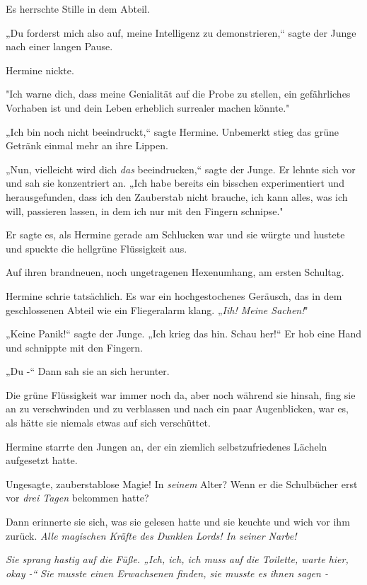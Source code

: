 {Es herrschte Stille in dem Abteil.

„Du forderst mich also auf, meine Intelligenz zu demonstrieren,“ sagte der Junge nach einer langen Pause.

Hermine nickte.

"Ich warne dich, dass meine Genialität auf die Probe zu stellen, ein gefährliches Vorhaben ist und dein Leben erheblich surrealer machen könnte."

„Ich bin noch nicht beeindruckt,“ sagte Hermine. Unbemerkt stieg das grüne Getränk einmal mehr an ihre Lippen.

„Nun, vielleicht wird dich \emph{das} beeindrucken,“ sagte der Junge. Er lehnte sich vor und sah sie konzentriert an. „Ich habe bereits ein bisschen experimentiert und herausgefunden, dass ich den Zauberstab nicht brauche, ich kann alles, was ich will, passieren lassen, in dem ich nur mit den Fingern schnipse."

Er sagte es, als Hermine gerade am Schlucken war und sie würgte und hustete und spuckte die hellgrüne Flüssigkeit aus.

Auf ihren brandneuen, noch ungetragenen Hexenumhang, am ersten Schultag.

Hermine schrie tatsächlich. Es war ein hochgestochenes Geräusch, das in dem geschlossenen Abteil wie ein Fliegeralarm klang. „\emph{Iih! Meine Sachen!}"

„Keine Panik!“ sagte der Junge. „Ich krieg das hin. Schau her!“ Er hob eine Hand und schnippte mit den Fingern.

„Du -“ Dann sah sie an sich herunter.

Die grüne Flüssigkeit war immer noch da, aber noch während sie hinsah, fing sie an zu verschwinden und zu verblassen und nach ein paar Augenblicken, war es, als hätte sie niemals etwas auf sich verschüttet.

Hermine starrte den Jungen an, der ein ziemlich selbstzufriedenes Lächeln aufgesetzt hatte.

Ungesagte, zauberstablose Magie! In \emph{seinem} Alter? Wenn er die Schulbücher erst vor \emph{drei Tagen} bekommen hatte?

Dann erinnerte sie sich, was sie gelesen hatte und sie keuchte und wich vor ihm zurück. \emph{Alle magischen Kräfte des Dunklen Lords! In seiner Narbe!}

\emph{Sie sprang hastig auf die Füße. „Ich, ich, ich muss auf die Toilette, warte hier, okay -“} \emph{Sie musste einen Erwachsenen finden, sie musste es ihnen sagen -}

}
